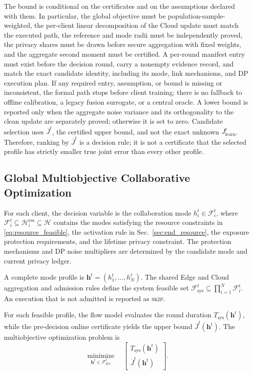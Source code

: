 \documentclass[5p,times]{elsarticle}
\theoremstyle{plain}
\theoremstyle{definition}
\theoremstyle{remark}
\begin{document}
The bound is conditional on the certificates and on
the assumptions declared with them. In particular, the
global objective must be population-sample-weighted,
the per-client linear decomposition of the Cloud
update must match the executed path, the reference and
mode radii must be independently proved, the privacy
shares must be drawn before secure aggregation with
fixed weights, and the aggregate second moment must be
certified. A per-round manifest entry must exist before
the decision round, carry a nonempty evidence record,
and match the exact candidate identity, including its
mode, link mechanisms, and DP execution plan. If any
required entry, assumption, or bound is missing or
inconsistent, the formal path stops before client
training; there is no fallback to offline calibration,
a legacy fusion surrogate, or a central oracle.
A lower bound is reported only when the aggregate noise
variance and its orthogonality to the clean update are
separately proved; otherwise it is set to zero.
Candidate selection uses $\overline J^t$, the certified
upper bound, and not the exact unknown $J_{\mathrm{learn}}^t$.
Therefore, ranking by $\overline J^t$ is a decision rule;
it is not a certificate that the selected profile has
strictly smaller true joint error than every other
profile.

\subsection{Global Multiobjective Collaborative Optimization}
\label{sec:global_optimization}

For each client, the decision variable is
the collaboration mode
\(h_i^t\in\mathcal F_i^t\), where
\(\mathcal F_i^t\subseteq
\mathcal H_i^{\mathrm{res}}\subseteq\mathcal H\)
contains the modes satisfying the resource
constraints in \eqref{eq:resource_feasible},
the activation rule in
Sec.~\ref{sec:end_resource},
the exposure protection requirements,
and the lifetime privacy constraint.
The protection mechanisms and DP noise
multipliers are determined by the candidate
mode and current privacy ledger.

A complete mode profile is
\(\mathbf h^t=(h_1^t,\ldots,h_N^t)\).
The shared Edge and Cloud aggregation and
admission rules define the system feasible
set
\(\mathcal F_{\mathrm{sys}}^t
\subseteq\prod_{i=1}^N\mathcal F_i^t\).
An execution that is not admitted is
reported as \textsc{skip}.

For each feasible profile, the flow model
evaluates the round duration
\(T_{\mathrm{sys}}(\mathbf h^t)\),
while the pre-decision online certificate yields
the upper bound
\(\overline J^t(\mathbf h^t)\).
The multiobjective optimization problem is
\begin{equation}
\underset{\mathbf h^t\in\mathcal F_{\mathrm{sys}}^t}
{\operatorname{minimize}}
\quad
\begin{bmatrix}
T_{\mathrm{sys}}(\mathbf h^t)\\
\overline J^t(\mathbf h^t)
\end{bmatrix}.
\label{eq:global_multiobjective}
\end{equation}
\end{document}
